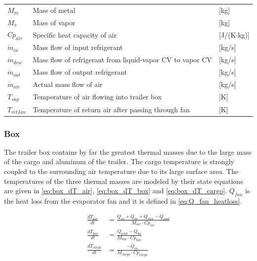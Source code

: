 \begin{center}
\begin{tabular}{l p{10cm} l}
		$M_{m}$          & Mass of metal                                                            & [\si{kg}]                         \\
		$M_{v}$          & Mass of vapor                                                            & [\si{kg}]                         \\
		$Cp_{air}$       & Specific heat capacity of air                                            & [\si{J}/(\si{K}$ \cdot $\si{kg})] \\
		$\dot{m}_{in} $  & Mass flow of input refrigerant                                           & [\si{kg}/\si{s}]                  \\
		$\dot{m}_{dew} $ & Mass flow of refrigerant from liquid-vapor CV to vapor CV                & [\si{kg}/\si{s}]                  \\
		$\dot{m}_{out} $ & Mass flow of output refrigerant                                          & [\si{kg}/\si{s}]                  \\
		$\dot{m}_{air}$  & Actual mass flow of air                                                  & [\si{kg}/\si{s}]                  \\
		$T_{sup} $       & Temperature of air flowing into trailer box                              & [\si{K}]                          \\
		$T_{retfan}$     & Temperature of return air after passing through fan                      & [\si{K}]
	\end{tabular}
\end{center}


\subsubsection{Box}
The trailer box contains by far the greatest thermal masses due to the large mass of the cargo and aluminum of the trailer. The cargo temperature is strongly coupled to the surrounding air temperature due to its large surface area. The temperatures of the three thermal masses are modeled by their state equations are given in \cref{eq:box_dT_air}, \cref{eq:box_dT_box} and \cref{eq:box_dT_cargo}. $Q_{fan}$ is the heat loss from the evaporator fan and it is defined in \cref{eq:Q_fan_heatloss}.

\begin{align}
	\frac{dT_{air}}{dt} & = \frac{Q_{ca} + Q_{ba} + Q_{fan} -Q_{cool}}{M_{air} \cdot Cp_{air}} 		\label{eq:box_dT_air}\\
	\frac{dT_{box}}{dt} & = \frac{Q_{amb} - Q_{ba}}{M_{box} \cdot Cp_{box}} 						\label{eq:box_dT_box}\\
	\frac{dT_{cargo}}{dt} & = \frac{-Q_{ca}}{M_{cargo} \cdot Cp_{cargo}}							\label{eq:box_dT_cargo}
\end{align}

